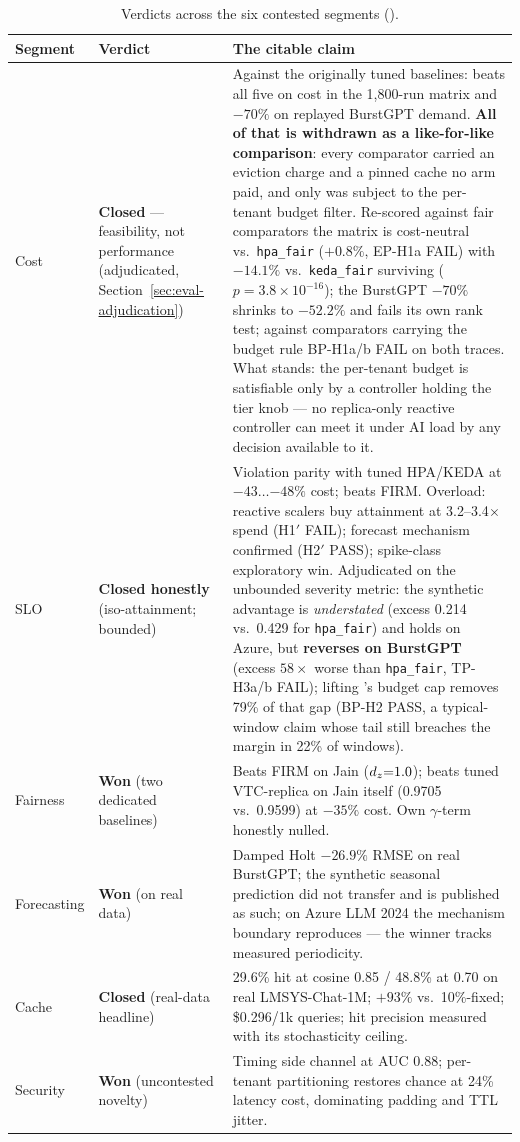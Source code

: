\begin{table}[htbp]
\centering\small
\begin{tabularx}{\textwidth}{@{}l>{\raggedright\arraybackslash}p{}X@{}}
\toprule
\textbf{Segment} & \textbf{Verdict} & \textbf{The citable claim} \\
\midrule
Cost & \textbf{Closed} --- feasibility, not performance (adjudicated,
Section~\ref{sec:eval-adjudication}) &
Against the originally tuned baselines: beats all five on cost in the
1{,}800-run matrix and $-70\%$ on replayed BurstGPT demand. \textbf{All of
that is withdrawn as a like-for-like comparison}: every comparator carried
an eviction charge and a pinned cache no \jcac{} arm paid, and only \jcac{}
was subject to the per-tenant budget filter. Re-scored against fair
comparators the matrix is cost-neutral vs.\ \texttt{hpa\_fair} ($+0.8\%$,
EP-H1a FAIL) with $-14.1\%$ vs.\ \texttt{keda\_fair} surviving
($p{=}3.8{\times}10^{-16}$); the BurstGPT $-70\%$ shrinks to $-52.2\%$ and
fails its own rank test; against comparators carrying the budget rule
BP-H1a/b FAIL on both traces. What stands: the per-tenant budget is
satisfiable only by a controller holding the tier knob --- no replica-only
reactive controller can meet it under AI load by any decision available to
it. \\
SLO & \textbf{Closed honestly} (iso-attainment; bounded) &
Violation parity with tuned HPA/KEDA at $-43\ldots{-48\%}$ cost; beats FIRM.
Overload: reactive scalers buy attainment at 3.2--3.4$\times$ spend
(H1$'$ FAIL); forecast mechanism confirmed (H2$'$ PASS); spike-class
exploratory win. Adjudicated on the unbounded severity metric: the synthetic
advantage is \emph{understated} (excess 0.214 vs.\ 0.429 for
\texttt{hpa\_fair}) and holds on Azure, but \textbf{reverses on BurstGPT}
(excess $58\times$ worse than \texttt{hpa\_fair}, TP-H3a/b FAIL); lifting
\jcac{}'s budget cap removes 79\% of that gap (BP-H2 PASS, a typical-window
claim whose tail still breaches the margin in 22\% of windows). \\
Fairness & \textbf{Won} (two dedicated baselines) &
Beats FIRM on Jain ($d_z{=}1.0$); beats tuned VTC-replica on Jain itself
(0.9705 vs.\ 0.9599) at $-35\%$ cost. Own $\gamma$-term honestly nulled. \\
Forecasting & \textbf{Won} (on real data) &
Damped Holt $-26.9\%$ RMSE on real BurstGPT; the synthetic seasonal
prediction did not transfer and is published as such; on Azure LLM 2024 the
mechanism boundary reproduces --- the winner tracks measured periodicity. \\
Cache & \textbf{Closed} (real-data headline) &
29.6\% hit at cosine 0.85 / 48.8\% at 0.70 on real LMSYS-Chat-1M; $+93\%$
vs.\ 10\%-fixed; \$0.296/1k queries; hit precision measured with its
stochasticity ceiling. \\
Security & \textbf{Won} (uncontested novelty) &
Timing side channel at AUC 0.88; per-tenant partitioning restores chance at
24\% latency cost, dominating padding and TTL jitter. \\
\bottomrule
\end{tabularx}
\caption{Verdicts across the six contested segments
().}
\label{tab:scoreboard}
\end{table}

